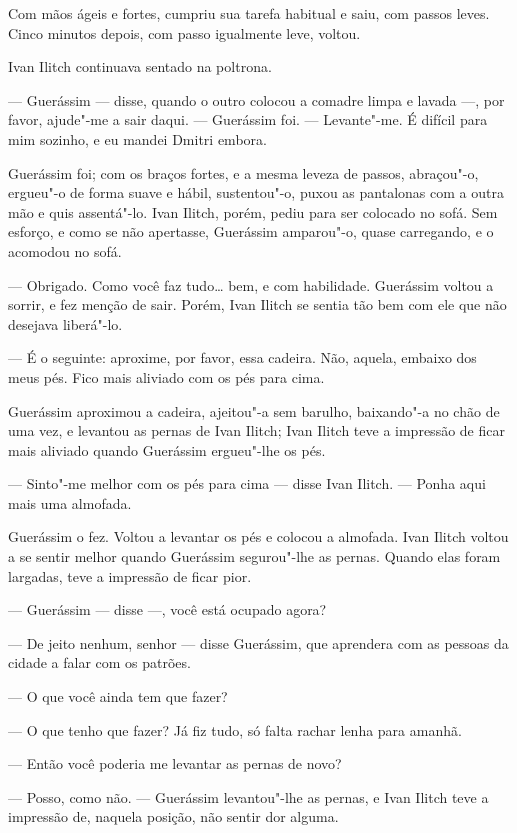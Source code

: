 Com mãos ágeis e fortes, cumpriu sua tarefa habitual e saiu, com passos
leves. Cinco minutos depois, com passo igualmente leve, voltou.

Ivan Ilitch continuava sentado na poltrona.

--- Guerássim --- disse, quando o outro colocou a comadre limpa e lavada ---,
por favor, ajude"-me a sair daqui. --- Guerássim foi. --- Levante"-me. É
difícil para mim sozinho, e eu mandei Dmitri embora.

Guerássim foi; com os braços fortes, e a mesma leveza de passos,
abraçou"-o, ergueu"-o de forma suave e hábil, sustentou"-o, puxou as
pantalonas com a outra mão e quis assentá"-lo. Ivan Ilitch, porém, pediu
para ser colocado no sofá. Sem esforço, e como se não apertasse,
Guerássim amparou"-o, quase carregando, e o acomodou no sofá.

--- Obrigado. Como você faz tudo\ldots{} bem, e com habilidade. Guerássim
voltou a sorrir, e fez menção de sair. Porém, Ivan Ilitch se sentia tão
bem com ele que não desejava liberá"-lo.

--- É o seguinte: aproxime, por favor, essa cadeira. Não, aquela, embaixo
dos meus pés. Fico mais aliviado com os pés para cima.

Guerássim aproximou a cadeira, ajeitou"-a sem barulho, baixando"-a no chão
de uma vez, e levantou as pernas de Ivan Ilitch; Ivan Ilitch teve a
impressão de ficar mais aliviado quando Guerássim ergueu"-lhe os pés.

--- Sinto"-me melhor com os pés para cima --- disse Ivan Ilitch. --- Ponha
aqui mais uma almofada.

Guerássim o fez. Voltou a levantar os pés e colocou a almofada. Ivan
Ilitch voltou a se sentir melhor quando Guerássim segurou"-lhe as pernas.
Quando elas foram largadas, teve a impressão de ficar pior.

--- Guerássim --- disse ---, você está ocupado agora?

--- De jeito nenhum, senhor --- disse Guerássim, que aprendera com as
pessoas da cidade a falar com os patrões.

--- O que você ainda tem que fazer?

--- O que tenho que fazer? Já fiz tudo, só falta rachar lenha para amanhã.

--- Então você poderia me levantar as pernas de novo?

--- Posso, como não. --- Guerássim levantou"-lhe as pernas, e Ivan Ilitch
teve a impressão de, naquela posição, não sentir dor alguma.

